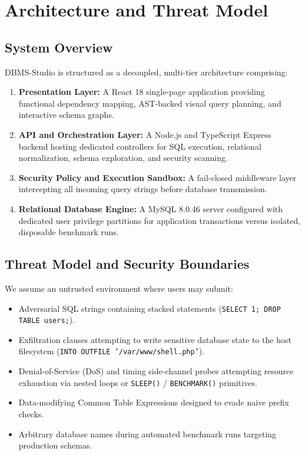 \documentclass[conference]{IEEEtran}
\begin{document}
\section{Architecture and Threat Model}

\subsection{System Overview}
DBMS-Studio is structured as a decoupled, multi-tier architecture comprising:
\begin{enumerate}
    \item \textbf{Presentation Layer:} A React 18 single-page application providing functional dependency mapping, AST-backed visual query planning, and interactive schema graphs.
    \item \textbf{API and Orchestration Layer:} A Node.js and TypeScript Express backend hosting dedicated controllers for SQL execution, relational normalization, schema exploration, and security scanning.
    \item \textbf{Security Policy and Execution Sandbox:} A fail-closed middleware layer intercepting all incoming query strings before database transmission.
    \item \textbf{Relational Database Engine:} A MySQL 8.0.46 server configured with dedicated user privilege partitions for application transactions versus isolated, disposable benchmark runs.
\end{enumerate}

\subsection{Threat Model and Security Boundaries}
We assume an untrusted environment where users may submit:
\begin{itemize}
    \item Adversarial SQL strings containing stacked statements (\texttt{SELECT 1; DROP TABLE users;}).
    \item Exfiltration clauses attempting to write sensitive database state to the host filesystem (\texttt{INTO OUTFILE '/var/www/shell.php'}).
    \item Denial-of-Service (DoS) and timing side-channel probes attempting resource exhaustion via nested loops or \texttt{SLEEP()} / \texttt{BENCHMARK()} primitives.
    \item Data-modifying Common Table Expressions designed to evade naive prefix checks.
    \item Arbitrary database names during automated benchmark runs targeting production schemas.
\end{itemize}
\end{document}
